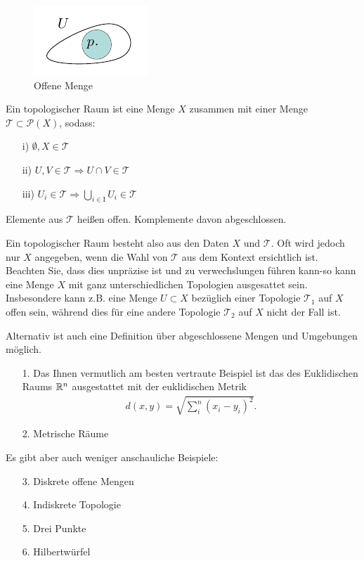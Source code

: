\begin{figure}[H]
\centering
\includegraphics[scale=1.5]{figures/tikz/openset.pdf}
\caption{Offene Menge}
\label{img:offenemenge}
\end{figure} 

\begin{defs}
Ein topologischer Raum ist eine Menge $X$ zusammen mit einer Menge $\mathcal{T} \subset \mathcal{P}(X)$, sodass:
\begin{enumerate}
\item[i)] $\emptyset, X \in \mathcal{T}$
\item[ii)] $U, V \in \mathcal{T} \Rightarrow  U \cap V \in \mathcal{T}$
\item [iii)] $U_i \in \mathcal{T} \Rightarrow\bigcup\limits_{i \in \text{I}} U_i \in \mathcal{T}$
\end{enumerate} 
Elemente aus $\mathcal{T}$ heißen offen. 
Komplemente davon abgeschlossen.
\end{defs}

Ein topologischer Raum besteht also aus den Daten $X$ und $\mathcal{T}$.
Oft wird jedoch nur $X$ angegeben, wenn die Wahl von $\mathcal{T}$ aus dem Kontext ersichtlich ist.
Beachten Sie, dass dies unpräzise ist und zu verwechslungen führen kann-so kann eine Menge $X$ mit ganz unterschiedlichen Topologien ausgesattet sein. 
Insbesondere kann z.B. eine Menge $U\subset X$ bezüglich einer Topologie $\mathcal{T}_1$ auf $X$ offen sein, während dies für eine andere Topologie $\mathcal{T}_2$ auf $X$
nicht der Fall ist.

\begin{bem}
Alternativ ist auch eine Definition über abgeschlossene Mengen und Umgebungen möglich.
\end{bem}

\begin{bsp}
\begin{itemize}
\item[1.] Das Ihnen vermutlich am besten vertraute Beispiel ist das des Euklidischen Raums $\mathbb{R}^n$ ausgestattet mit der euklidischen Metrik
\begin{align*}
d(x,y) = \sqrt{\sum_i^n (x_i - y_i)^2}.
\end{align*}
\item[2.] Metrische Räume\\
\end{itemize}
Es gibt aber auch weniger anschauliche Beispiele:

\begin{itemize}
\item[3.] Diskrete offene Mengen
\item[4.] Indiskrete Topologie
\item[5.] Drei Punkte
\item[6.] Hilbertwürfel
\end{itemize}
\end{bsp}

